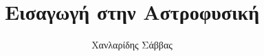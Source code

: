 \documentclass[hidelinks, a4paper, 12pt]{report}
\title{Εισαγωγή στην Αστροφυσική}
\author{Χανλαρίδης Σάββας}
\begin{document}
    
    
    
    \renewcommand{\contentsname}{Περιεχόμενα}
    \renewcommand{\listfigurename}{Λίστα Σχημάτων}
    \renewcommand{\listtablename}{Λίστα Πινάκων}
    \renewcommand{\chaptername}{Κεφάλαιο}
    \renewcommand{\appendixname}{Παράρτημα}
    \renewcommand{\bibname}{Βιβλιογραφία}
    
    \setlength{\parskip}{0.5em}     %
    

    \tableofcontents
    
    \newpage
    
    \setlength{\parskip}{1em}       %

    
    
    
    
    
    
    
    
    \appendix
    
    
    
    
\end{document}
